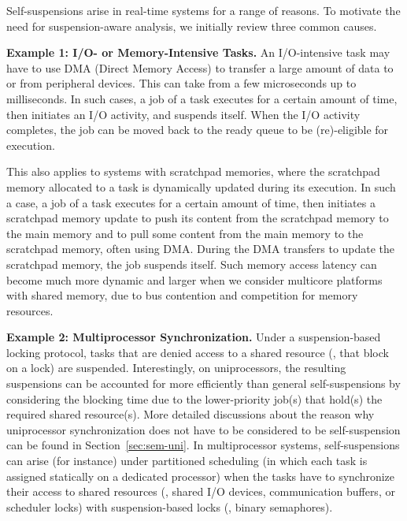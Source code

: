 \label{sec:examples}

Self-suspensions arise in real-time systems for a range of reasons. To motivate the need for suspension-aware analysis, we initially review three common causes. 


{\bf Example 1: I/O- or Memory-Intensive Tasks.}  \hspace{0.1in}
An I/O-intensive task may have to use DMA (Direct Memory Access) to transfer a large amount of data to or from peripheral devices. This can take from a few microseconds up to milliseconds. In such cases, a job of a task executes for a certain amount of time, then initiates an I/O activity, and suspends itself. When the I/O activity completes, the job can be moved back to the ready queue to be (re)-eligible for execution. 

This also applies to systems with scratchpad memories, where the scratchpad memory allocated to a task is dynamically updated during its execution. In such a case, a job of a task executes for a certain amount of time, then initiates a scratchpad memory update to push its content from the scratchpad memory to the main memory and to pull some content from the main memory to the scratchpad memory, often using DMA. During the DMA transfers to update the scratchpad memory, the job suspends itself. Such memory access latency can become much more dynamic and larger when we consider multicore platforms with shared memory, due to bus contention and competition for memory resources.

{\bf Example 2: Multiprocessor Synchronization.} \hspace{0.1in}
Under a suspension-based locking protocol, tasks that are denied access to a shared resource (\ie, that block on a lock) are suspended. Interestingly, on uniprocessors, the resulting suspensions can be accounted for more efficiently than general self-suspensions by considering the blocking time due to the lower-priority job(s) that hold(s) the required shared resource(s). More detailed discussions about the reason why uniprocessor synchronization does not have to be considered to be self-suspension can be found in Section~\ref{sec:sem-uni}. In multiprocessor systems, self-suspensions can arise (for instance) under partitioned scheduling (in which each task is assigned statically on a dedicated processor) when the tasks have to synchronize their access to shared resources (\eg, shared I/O devices, communication buffers, or scheduler locks) with suspension-based locks (\eg, binary semaphores). 

